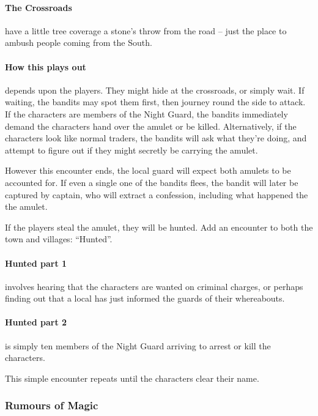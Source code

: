 \paragraph{The Crossroads} have a little tree coverage a stone's throw from the road -- just the place to ambush people coming from the South.

\paragraph{How this plays out} depends upon the players.  They might hide at the crossroads, or simply wait.  If waiting, the bandits may spot them first, then journey round the side to attack.  If the characters are members of the Night Guard, the bandits immediately demand the characters hand over the amulet or be killed.  Alternatively, if the characters look like normal traders, the bandits will ask what they're doing, and attempt to figure out if they might secretly be carrying the amulet.

\humansoldier

However this encounter ends, the local guard will expect both amulets to be accounted for.  If even a single one of the bandits flees, the bandit will later be captured by \gls{captain}, who will extract a confession, including what happened the the amulet.

If the players steal the amulet, they will be hunted.  Add an encounter to both the town and villages: ``Hunted''.

\paragraph{Hunted part 1} involves hearing that the characters are wanted on criminal charges, or perhaps finding out that a local has just informed the guards of their whereabouts.

\paragraph{Hunted part 2} is simply ten members of the Night Guard arriving to arrest or kill the characters.

This simple encounter repeats until the characters clear their name.

\subsubsection{Rumours of Magic}

